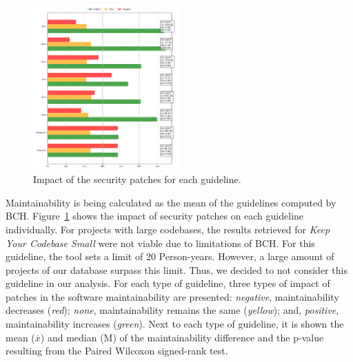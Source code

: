 \documentclass[10pt,conference]{IEEEtran}
\begin{document}
\begin{figure}[h]
 	\centering
 	\includegraphics[width=0.5\textwidth]{figures/impact_per_guideline.pdf}
 	\caption{Impact of the security patches for each guideline.}
	\label{fig:guidelines}
\end{figure}


Maintainability is being calculated as the mean of the guidelines computed
by BCH. Figure~\ref{fig:guidelines} shows the impact of security patches on each 
guideline individually. For projects with large 
codebases, the results retrieved for \emph{Keep Your Codebase Small} were not 
viable due to limitations of BCH. For this guideline, the tool sets a limit of 20 Person-years. However, a large amount of projects of our database surpass this limit. Thus, we decided to not consider this guideline 
in our analysis. For each type of
guideline, three types of impact of patches in the software maintainability
are presented: \emph{negative}, maintainability decreases (\emph{red});
\emph{none}, maintainability remains the same (\emph{yellow}); and,
\emph{positive}, maintainability increases (\emph{green}). Next to each
type of guideline, it is shown the mean ($\overline{x}$) and median (M)
of the maintainability difference and the p-value resulting from the
Paired Wilcoxon signed-rank test.
\end{document}

